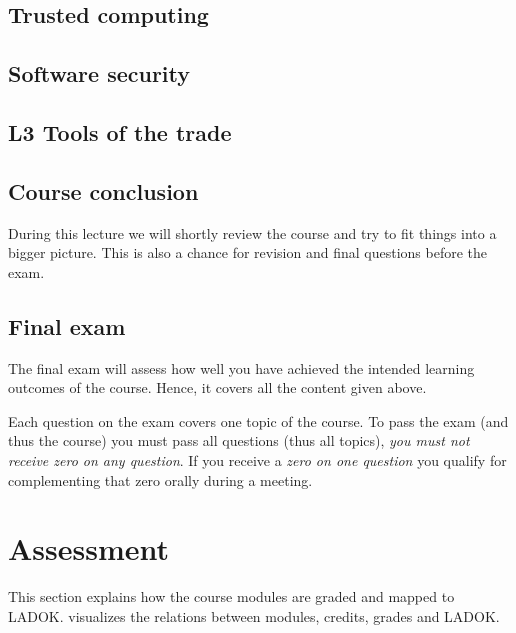 {\subsection{Trusted computing}%
\label{trustcomp}


\subsection{Software security}%
\label{software}


\subsection{L3 Tools of the trade}\label{tools}


\subsection{Course conclusion}\label{conclusion}

During this lecture we will shortly review the course and try to fit things 
into a bigger picture.
This is also a chance for revision and final questions before the exam.

\subsection{Final exam}

The final exam will assess how well you have achieved the intended learning 
outcomes of the course.
Hence, it covers all the content given above.

Each question on the exam covers one topic of the course.
To pass the exam (and thus the course) you must pass all questions (thus all 
topics), \ie \emph{you must not receive zero on any question}.
If you receive a \emph{zero on one question} you qualify for complementing that 
zero orally during a meeting.
} %


\section{Assessment}%
\label{Assessment}


This section explains how the course modules are graded and mapped to LADOK\@.
 visualizes the relations between modules, credits, grades and 
LADOK\@.

